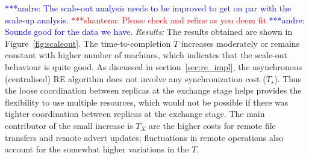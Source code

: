 \documentclass{rspublic}
\newcommand{\jhanote}[1]{ {\textcolor{red} { ***shantenu: #1 }}}
\newcommand{\alnote}[1]{ {\textcolor{blue} { ***andre: #1 }}}
\newcommand{\alnote}[1]{}
\newcommand{\jhanote}[1]{}
\begin{document}
\alnote{The scale-out analysis needs to be improved to get on par with the
scale-up analysis.}\jhanote{Please check and refine as you deem fit}
\alnote{Sounds good for the data we have.}
{\it Results:} The results obtained are shown in
Figure~\ref{fig:scaleout}.  The time-to-completion $T$ increases
moderately or remains constant with higher number of machines, which
indicates that the scale-out behaviour is quite good.  As discussed in
section~\ref{sec:re_impl}, the asynchronous (centralised) RE algorithm
does not involve any synchronization cost ($T_s$). Thus the loose
coordination between replicas at the exchange stage helps provides the
flexibility to use multiple resources, which would not be possible if
there was tighter coordination between replicas at the exchange stage.
The main contributor of the small increase is $T_X$ are the higher
costs for remote file transfers and remote advert updates;
fluctuations in remote operations also account for the somewhat higher
variations in the $T$.





\end{document}
